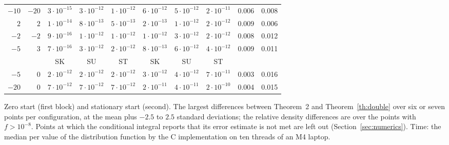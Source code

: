\documentclass[ecta,nameyear,final,supplement]{econsocart}
\newcommand{\Sk}{\textsf{\upshape SK}}
\newcommand{\Su}{\textsf{\upshape SU}}
\newcommand{\St}{\textsf{\upshape ST}}
\theoremstyle{plain}
\theoremstyle{definition}
\begin{document}
\begin{table}[tbp]
\begin{center}
\begin{tabular}{rrcccccccc}
$-10$ & $-20$ & $3\cdot10^{-15}$ & $3\cdot10^{-12}$ & $1\cdot10^{-12}$ & $6\cdot10^{-12}$ & $5\cdot10^{-12}$ & $2\cdot10^{-11}$ & 0.006 & 0.008\\
$2$ & $2$ & $1\cdot10^{-14}$ & $8\cdot10^{-13}$ & $5\cdot10^{-13}$ & $2\cdot10^{-13}$ & $1\cdot10^{-12}$ & $2\cdot10^{-12}$ & 0.009 & 0.006\\
$-2$ & $-2$ & $9\cdot10^{-16}$ & $1\cdot10^{-12}$ & $1\cdot10^{-12}$ & $1\cdot10^{-12}$ & $3\cdot10^{-12}$ & $2\cdot10^{-12}$ & 0.008 & 0.012\\
$-5$ & $3$ & $7\cdot10^{-16}$ & $3\cdot10^{-12}$ & $2\cdot10^{-12}$ & $8\cdot10^{-13}$ & $6\cdot10^{-12}$ & $4\cdot10^{-12}$ & 0.009 & 0.011\\
\midrule
 & & \Sk & \Su & \St & \Sk & \Su & \St & &\\
\cmidrule(lr){3-5}\cmidrule(lr){6-8}
$-5$ & $0$ & $2\cdot10^{-12}$ & $2\cdot10^{-12}$ & $2\cdot10^{-12}$ & $3\cdot10^{-12}$ & $4\cdot10^{-12}$ & $7\cdot10^{-11}$ & 0.003 & 0.016\\
$-20$ & $0$ & $7\cdot10^{-12}$ & $7\cdot10^{-12}$ & $7\cdot10^{-12}$ & $2\cdot10^{-11}$ & $4\cdot10^{-11}$ & $2\cdot10^{-10}$ & 0.004 & 0.015\\
\bottomrule
\end{tabular}
\end{center}
{\small Zero start (first block) and stationary start (second).  The largest differences between Theorem~2 and Theorem~\ref{th:double} over six or seven points per configuration, at the mean plus $-2.5$ to $2.5$ standard deviations; the relative density differences are over the points with $f>10^{-8}$.  Points at which the conditional integral reports that its error estimate is not met are left out (Section~\ref{sec:numerics}).  Time: the median per value of the distribution function by the C implementation on ten threads of an M4 laptop.}
\end{table}
\end{document}

